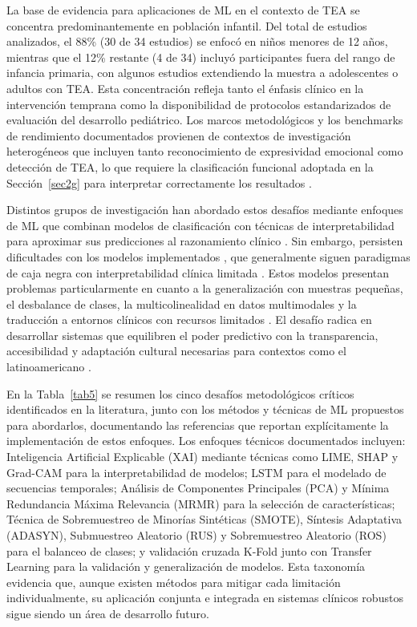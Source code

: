 \documentclass[3p,twocolumn,times]{elsarticle}
\begin{document}
	La base de evidencia para aplicaciones de ML en el contexto de TEA se concentra
	predominantemente en población infantil. Del total de estudios analizados, el 88\%
	(30 de 34 estudios) se enfocó en niños menores de 12 años, mientras que el 12\%
	restante (4 de 34) incluyó participantes fuera del rango de infancia primaria, con
	algunos estudios extendiendo la muestra a adolescentes o adultos con TEA. Esta
	concentración refleja tanto el énfasis clínico en la intervención temprana como la
	disponibilidad de protocolos estandarizados de evaluación del desarrollo pediátrico.
	Los marcos metodológicos y los benchmarks de rendimiento documentados provienen de
	contextos de investigación heterogéneos que incluyen tanto reconocimiento de
	expresividad emocional como detección de TEA, lo que requiere la clasificación
	funcional adoptada en la Sección~\ref{sec2g} para interpretar correctamente los
	resultados \cite{Washington2022}.
	
	Distintos grupos de investigación han abordado estos desafíos mediante enfoques de ML que combinan modelos de clasificación con técnicas de interpretabilidad para aproximar
	sus predicciones al razonamiento clínico \cite{Sariyanidi2025}. Sin embargo,
	persisten dificultades con los modelos implementados \cite{Radocaj2025}, que
	generalmente siguen paradigmas de caja negra con interpretabilidad clínica limitada
	\cite{Rhatassi2024}. Estos modelos presentan problemas particularmente en cuanto a
	la generalización con muestras pequeñas, el desbalance de clases, la
	multicolinealidad en datos multimodales y la traducción a entornos clínicos con
	recursos limitados \cite{Alam2025}. El desafío radica en desarrollar sistemas que
	equilibren el poder predictivo con la transparencia, accesibilidad y adaptación
	cultural necesarias para contextos como el latinoamericano \cite{Shaik2025}.
	
	En la Tabla~\ref{tab5} se resumen los cinco desafíos metodológicos críticos
	identificados en la literatura, junto con los métodos y técnicas de ML propuestos
	para abordarlos, documentando las referencias que reportan explícitamente la
	implementación de estos enfoques. Los enfoques técnicos documentados incluyen:
	Inteligencia Artificial Explicable (XAI) mediante técnicas como LIME, SHAP y
	Grad-CAM para la interpretabilidad de modelos; LSTM para el modelado de secuencias
	temporales; Análisis de Componentes Principales (PCA) y Mínima Redundancia Máxima
	Relevancia (MRMR) para la selección de características; Técnica de Sobremuestreo
	de Minorías Sintéticas (SMOTE), Síntesis Adaptativa (ADASYN), Submuestreo
	Aleatorio (RUS) y Sobremuestreo Aleatorio (ROS) para el balanceo de clases; y
	validación cruzada K-Fold junto con Transfer Learning para la validación y
	generalización de modelos. Esta taxonomía evidencia que, aunque existen métodos
	para mitigar cada limitación individualmente, su aplicación conjunta e integrada
	en sistemas clínicos robustos sigue siendo un área de desarrollo futuro.
	
\end{document}
